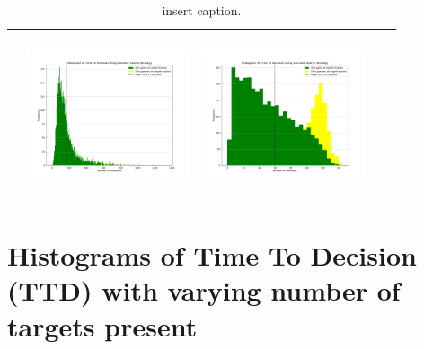 \begin{landscape}
\begin{table}[h!]
\begin{tabular}{ | m{8mm} | c | c | c | c |}
\begin{minipage}[c][48mm][c]{48mm}
    \end{minipage}
    &
    \begin{minipage}[c][48mm][c]{48mm}
      \includegraphics[width=48mm, height=48mm]{Chapters/MultiAgentTargetDetection/Figs/Histograms/MiscalibratedSensor/05-02/05-02RandomHistogram.png}
    \end{minipage}
    &
    \begin{minipage}[c][48mm][c]{48mm}
      \includegraphics[width=48mm, height=48mm]{Chapters/MultiAgentTargetDetection/Figs/Histograms/MiscalibratedSensor/05-02/05-02SaccadicHistogram.png}
    \end{minipage}
    \\
    \hline
   
  \end{tabular}
  \caption{insert caption. }\label{table:ORToolsResults}
\end{table}
\break



\vspace*{\fill}
\section{Histograms of Time To Decision (TTD) with varying number of targets present}


\end{landscape}
